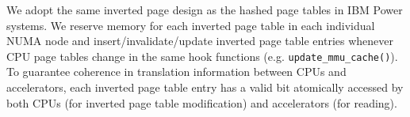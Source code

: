 \vspace{2mm}
 We adopt the same inverted
page design as the hashed page tables in IBM Power systems. We reserve
memory for each inverted page table in each individual NUMA node and
insert/invalidate/update inverted page table entries whenever CPU page
tables change in the same hook functions
(e.g. \verb|update_mmu_cache()|). To guarantee coherence in
translation information between CPUs and accelerators, each inverted
page table entry has a valid bit atomically accessed by both CPUs (for
inverted page table modification) and accelerators (for
reading). 

  
\begin{comment}
Although end-to-end performance evaluation requires a full implementation of spryVM in a modern OS (e.g., Linux, FreeBSD), like prior work which require OS changes \cite{talluri:surpassing, talluri:tradeoffs, talluri:pagetable}, we note that such implementation is a multi-man-year project. Consequently, like those studies, we instead inspect an open-source OS (i.e., Linux) and qualitatively discuss our proposed modifications.  

Fortunately, our two main modifications (i.e., memory-set matching and managing multiple page tables) are currently implemented in modern OS's. For instance, FreeBSD implements page coloring to avoid consecutive virtual pages mapping to the same cache set. FreeBSB does this with a free list of pages per cache set~\cite{mckusick:design}, guaranteeing that two consecutive virtual pages map to different cache sets. We can similarly extend the page placement policy to make both the VPN and PFN map to the same memory set. Further, the Linux Heterogeneous Memory Management (HMM) patch sets up multiple page tables and maintains the consistency~\cite{glisse:hmm}. We can leverage the lessons learned from these patches.

Table~\ref{tab:table_modifications} and Table~\ref{tab:table_overheads} shed more light on the OS changes and the potential overheads respectively. Although set associative VM is beneficial for a wide range of workloads, there might be cases for which full associative VM is required. Hence, we envision spryVM to be an optional optimization (i.e., a process, set of processes, or the whole system can fall back to the conventional translation). This is conceptually similar to the way OSes support superpages, for which large portions of the OS required modifications along with their associated overheads with respect to supporting a single page size~\cite{talluri:surpassing, navarro:practical, kwon:coordinated}. Analogously, when super pages are not beneficial or impossible to generate, processes fall back to base pages. 
 

\end{comment}
